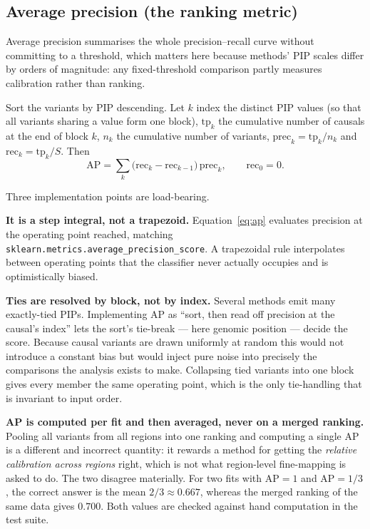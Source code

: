 \documentclass[11pt,a4paper]{article}
\newcommand{\pip}{\mathrm{PIP}}
\begin{document}
\subsection{Average precision (the ranking metric)}\label{sec:ap}

Average precision summarises the whole precision--recall curve without
committing to a threshold, which matters here because methods' PIP scales
differ by orders of magnitude: any fixed-threshold comparison partly measures
calibration rather than ranking.

Sort the variants by $\pip$ descending. Let $k$ index the distinct PIP values
(so that all variants sharing a value form one block), $\mathrm{tp}_k$ the
cumulative number of causals at the end of block $k$, $n_k$ the cumulative
number of variants, $\mathrm{prec}_k=\mathrm{tp}_k/n_k$ and
$\mathrm{rec}_k=\mathrm{tp}_k/S$. Then
\begin{equation}
\mathrm{AP}=\sum_k\bigl(\mathrm{rec}_k-\mathrm{rec}_{k-1}\bigr)\,\mathrm{prec}_k ,
\qquad \mathrm{rec}_0=0 .
\label{eq:ap}
\end{equation}

Three implementation points are load-bearing.

\textbf{It is a step integral, not a trapezoid.} Equation~\eqref{eq:ap}
evaluates precision at the operating point reached, matching
\texttt{sklearn.metrics.average\_precision\_score}. A trapezoidal rule
interpolates between operating points that the classifier never actually
occupies and is optimistically biased.

\textbf{Ties are resolved by block, not by index.} Several methods emit many
exactly-tied PIPs. Implementing AP as ``sort, then read off precision at the
causal's index'' lets the sort's tie-break --- here genomic position --- decide
the score. Because causal variants are drawn uniformly at random this would not
introduce a constant bias but would inject pure noise into precisely the
comparisons the analysis exists to make. Collapsing tied variants into one
block gives every member the same operating point, which is the only
tie-handling that is invariant to input order.

\textbf{AP is computed per fit and then averaged, never on a merged ranking.}
Pooling all variants from all regions into one ranking and computing a single
AP is a different and incorrect quantity: it rewards a method for getting the
\emph{relative calibration across regions} right, which is not what
region-level fine-mapping is asked to do. The two disagree materially. For two
fits with $\mathrm{AP}=1$ and $\mathrm{AP}=1/3$, the correct answer is the mean
$2/3\approx0.667$, whereas the merged ranking of the same data gives $0.700$.
Both values are checked against hand computation in the test suite.
\end{document}
